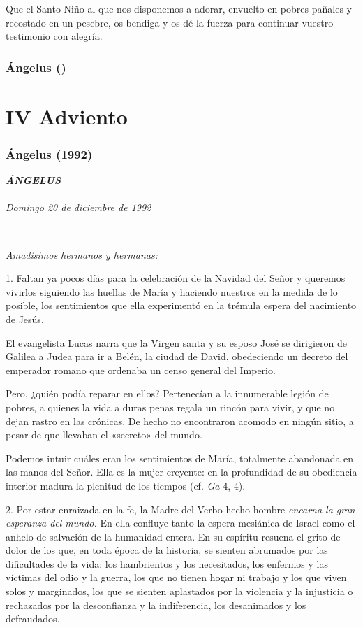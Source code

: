 Que el Santo Niño al que nos disponemos a adorar, envuelto en pobres
pañales y recostado en un pesebre, os bendiga y os dé la fuerza para
continuar vuestro testimonio con alegría.

\subsubsection{Ángelus ()}

\section{IV Adviento}
\subsubsection{Ángelus (1992)}
\emph{\textbf{ÁNGELUS\\
	}\\
	Domingo 20 de diciembre de 1992}

~

\emph{Amadísimos hermanos y hermanas:}

1. Faltan ya pocos días para la celebración de la Navidad del Señor y
queremos vivirlos siguiendo las huellas de María y haciendo nuestros en
la medida de lo posible, los sentimientos que ella experimentó en la
trémula espera del nacimiento de Jesús.

El evangelista Lucas narra que la Virgen santa y su esposo José se
dirigieron de Galilea a Judea para ir a Belén, la ciudad de David,
obedeciendo un decreto del emperador romano que ordenaba un censo
general del Imperio.

Pero, ¿quién podía reparar en ellos? Pertenecían a la innumerable legión
de pobres, a quienes la vida a duras penas regala un rincón para vivir,
y que no dejan rastro en las crónicas. De hecho no encontraron acomodo
en ningún sitio, a pesar de que llevaban el «secreto» del mundo.

Podemos intuir cuáles eran los sentimientos de María, totalmente
abandonada en las manos del Señor. Ella es la mujer creyente: en la
profundidad de su obediencia interior madura la plenitud de los tiempos
(cf. \emph{Ga} 4, 4).

2. Por estar enraizada en la fe, la Madre del Verbo hecho hombre
\emph{encarna la gran esperanza del mundo.} En ella confluye tanto la
espera mesiánica de Israel como el anhelo de salvación de la humanidad
entera. En su espíritu resuena el grito de dolor de los que, en toda
época de la historia, se sienten abrumados por las dificultades de la
vida: los hambrientos y los necesitados, los enfermos y las víctimas del
odio y la guerra, los que no tienen hogar ni trabajo y los que viven
solos y marginados, los que se sienten aplastados por la violencia y la
injusticia o rechazados por la desconfianza y la indiferencia, los
desanimados y los defraudados.

